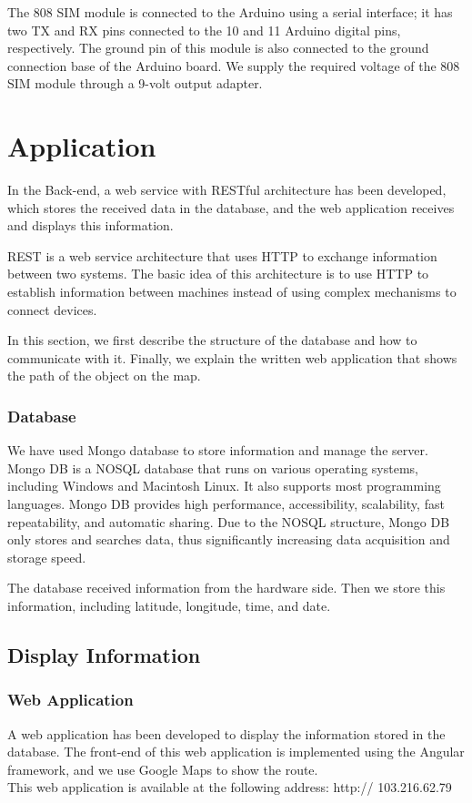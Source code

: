 The 808 SIM module is connected to the Arduino using a serial interface; it has two TX and RX pins connected to the 10 and 11 Arduino digital pins, respectively. The ground pin of this module is also connected to the ground connection base of the Arduino board. We supply the required voltage of the 808 SIM module through a 9-volt output adapter.
\section{Application}
In the Back-end, a web service with RESTful architecture has been developed, which stores the received data in the database, and the web application receives and displays this information.

REST is a web service architecture that uses HTTP to exchange information between two systems. The basic idea of this architecture is to use HTTP to establish information between machines instead of using complex mechanisms to connect devices.

In this section, we first describe the structure of the database and how to communicate with it. Finally, we explain the written web application that shows the path of the object on the map.
\subsubsection{Database}
We have used Mongo database to store information and manage the server. Mongo DB is a NOSQL database that runs on various operating systems, including Windows and Macintosh Linux. It also supports most programming languages. Mongo DB provides high performance, accessibility, scalability, fast repeatability, and automatic sharing.
Due to the NOSQL structure, Mongo DB only stores and searches data, thus significantly increasing data acquisition and storage speed.

The database received information from the hardware side. Then we store this information, including latitude, longitude, time, and date.

\subsection{Display Information}
\subsubsection{Web Application}
A web application has been developed to display the information stored in the database. The front-end of this web application is implemented using the Angular framework, and we use Google Maps to show the route.\\
This web application is available at the following address: http:// 103.216.62.79

